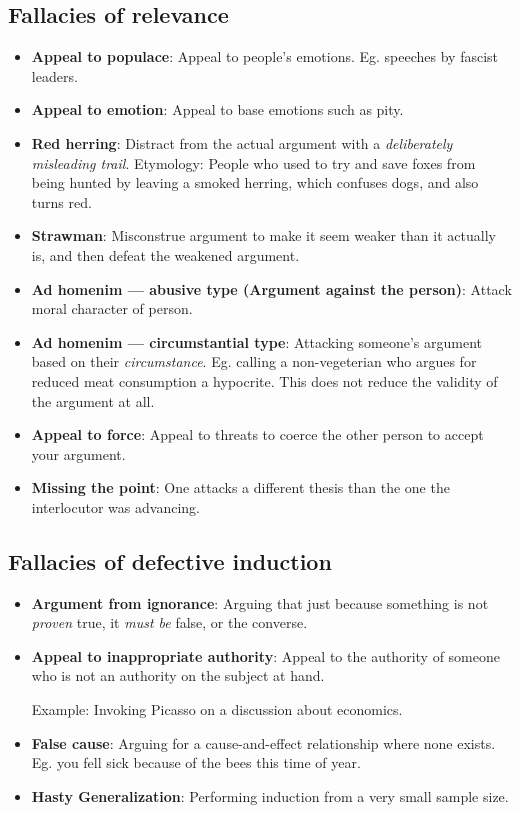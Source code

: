 \documentclass[5pt]{book}
\begin{document}
\subsection{Fallacies of relevance}
\begin{itemize}
    \item \textbf{Appeal to populace}: Appeal to people's emotions. Eg. speeches
        by fascist leaders.
    \item \textbf{Appeal to emotion}: Appeal to base emotions such as pity.
    \item \textbf{Red herring}: Distract from the actual argument with a
        \textit{deliberately misleading trail}. Etymology: People who used to
        try and save foxes from being hunted by leaving a smoked herring, which
        confuses dogs, and also turns red.
    \item \textbf{Strawman}: Misconstrue argument to make it seem weaker
        than it actually is, and then defeat the weakened argument.
    \item \textbf{Ad homenim --- abusive type (Argument against the person)}: Attack moral character
        of person. 
    \item \textbf{Ad homenim --- circumstantial type}: Attacking someone's argument
        based on their \textit{circumstance}. Eg. calling a non-vegeterian who
        argues for reduced meat consumption a hypocrite. This does not reduce the
        validity of the argument at all.
    \item \textbf{Appeal to force}: Appeal to threats to coerce the other
        person to accept your argument.
    \item \textbf{Missing the point}: One attacks a different thesis than
        the one the interlocutor was advancing.
\end{itemize}
\subsection{Fallacies of defective induction}
\begin{itemize}
    \item \textbf{Argument from ignorance}: Arguing that just because something
        is not \emph{proven} true, it \textit{must be} false, or the converse.
    \item \textbf{Appeal to inappropriate authority}: Appeal to the authority
        of someone who is not an authority on the subject at hand. 

        Example: Invoking Picasso on a discussion about economics.

    \item \textbf{False cause}: Arguing for a cause-and-effect relationship
        where none exists. Eg. you fell sick because of the bees this time
        of year.

    \item \textbf{Hasty Generalization}: Performing induction from a very
        small sample size.
\end{itemize}
\end{document}
